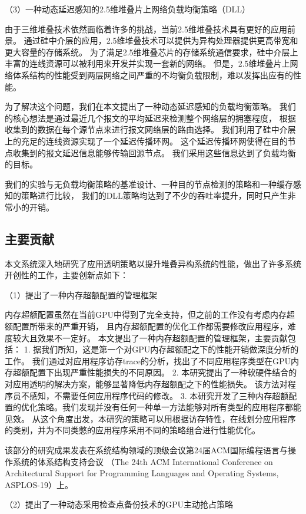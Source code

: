 （3）一种动态延迟感知的2.5维堆叠片上网络负载均衡策略（DLL）

由于三维堆叠技术依然面临着许多的挑战，当前2.5维堆叠技术具有更好的应用前景。
通过硅中介层的应用，2.5维堆叠技术可以提供为异构处理器提供更高带宽和更大容量的存储系统。
为了满足2.5维堆叠芯片的存储系统通信要求，硅中介层上丰富的连线资源可以被利用来开发并实现一套新的网络。
但是，2.5维堆叠片上网络体系结构的性能受到两层网络之间严重的不均衡负载限制，难以发挥出应有的性能。

为了解决这个问题，我们在本文提出了一种动态延迟感知的负载均衡策略。
我们的核心想法是通过最近几个报文的平均延迟来检测整个网络层的拥塞程度，
根据收集到的数据在每个源节点来进行报文网络层的路由选择。
我们利用了硅中介层上的充足的连线资源实现了一个延迟传播环网。
这个延迟传播环网使得在目的节点收集到的报文延迟信息能够传输回源节点。
我们采用这些信息达到了负载均衡的目标。

我们的实验与无负载均衡策略的基准设计、一种目的节点检测的策略和一种缓存感知的策略进行比较，
我们的DLL策略均达到了不少的吞吐率提升，同时只产生非常小的开销。


\subsection{主要贡献}
本文系统深入地研究了应用透明策略以提升堆叠异构系统的性能，做出了许多系统开创性的工作，主要创新点如下：

（1）提出了一种内存超额配置的管理框架

内存超额配置虽然在当前GPU中得到了完全支持，但之前的工作没有考虑内存超额配置所带来的严重开销，
且内存超额配置的优化工作都需要修改应用程序，难度较大且效果不一定好。
本文提出了一种内存超额配置的管理框架，主要贡献包括：
1. 据我们所知，这是第一个对GPU内存超额配之下的性能开销做深度分析的工作。
我们通过对应用程序访存trace的分析，找出了不同应用程序类型在GPU内存超额配置下出现严重性能损失的不同原因。
2. 本研究提出了一种软硬件结合的对应用透明的解决方案，能够显著降低内存超额配之下的性能损失。
该方法对程序员不感知，不需要任何应用程序代码的修改。
3. 本研究开发了三种内存超额配置的优化策略。我们发现并没有任何一种单一方法能够对所有类型的应用程序都能见效。
从这个角度出发，本研究的策略可以用根据访存特性，在线划分应用程序的类别，并为不同类憋的应用程序采用不同的策略组合进行性能优化。

该部分的研究成果发表在系统结构领域的顶级会议第24届ACM国际编程语言与操作系统的体系结构支持会议
（The 24th ACM International Conference on Architectural Support for Programming Languages and Operating Systems, ASPLOS-19）上。

（2）提出了一种动态采用检查点备份技术的GPU主动抢占策略

